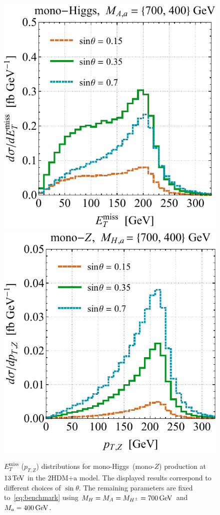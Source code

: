 \documentclass[a4paper, 11pt,notoc]{article}
\newcommand{\MET}{\ensuremath{E_T^\mathrm{miss}}\xspace}
\newcommand{\mA}{\ensuremath{M_{A}}\xspace}
\newcommand{\ma}{\ensuremath{M_{a}}\xspace}
\newcommand{\mH}{\ensuremath{M_{H}}\xspace}
\newcommand{\mHc}{\ensuremath{M_{H^{\pm}}}\xspace}
\newcommand{\hdma}{\ensuremath{\textrm{2HDM+a}}\xspace}
\begin{document}
\begin{figure}[t!]
\centering
\includegraphics[height=0.45\textwidth]{svarl.pdf} \qquad 
\includegraphics[height=0.45\textwidth]{svarr.pdf}
\vspace{2mm}
\caption{\label{fig:svar} $\MET$ ($p_{T,Z}$) distributions for mono-Higgs~(mono-$Z$) production at $13 \, {\rm TeV}$  in the \hdma model. The displayed results correspond to different choices of $\sin \theta$. The remaining parameters are fixed to~\eqref{eq:benchmark} using $\mH = \mA = \mHc = 700 \, {\rm GeV}$ and $\ma = 400 \, {\rm GeV}$. }
\end{figure}
\end{document}
